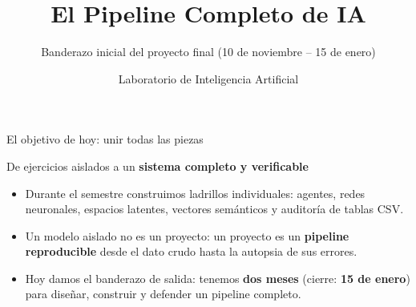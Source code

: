 \documentclass[aspectratio=169,11pt]{beamer}
\title{El Pipeline Completo de IA}
\subtitle{Banderazo inicial del proyecto final (10 de noviembre -- 15 de enero)}
\author{Laboratorio de Inteligencia Artificial}
\date{}
\begin{document}
\begin{frame}
  \titlepage
\end{frame}

\begin{frame}{El objetivo de hoy: unir todas las piezas}
  \begin{center}
    \Large De ejercicios aislados a un \textbf{sistema completo y verificable}
  \end{center}
  \vfill
  \begin{itemize}
    \item Durante el semestre construimos ladrillos individuales: agentes, redes neuronales, espacios latentes, vectores semánticos y auditoría de tablas CSV.
    \item Un modelo aislado no es un proyecto: un proyecto es un \textbf{pipeline reproducible} desde el dato crudo hasta la autopsia de sus errores.
    \item Hoy damos el banderazo de salida: tenemos \textbf{dos meses} (cierre: \textbf{15 de enero}) para diseñar, construir y defender un pipeline completo.
  \end{itemize}
\end{frame}
\end{document}
